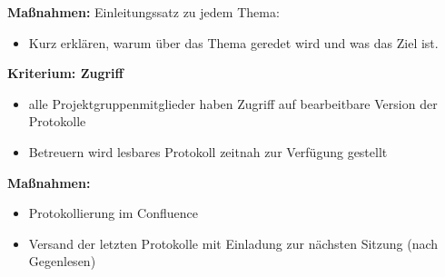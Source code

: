 \textbf{Maßnahmen: }
Einleitungssatz zu jedem Thema: 
\begin{itemize}
\item	Kurz erklären, warum über das Thema geredet wird und was das Ziel ist.
\end{itemize}

\textbf{Kriterium: Zugriff}
\begin{itemize}
\item	alle Projektgruppenmitglieder haben Zugriff auf bearbeitbare Version der Protokolle
\item	Betreuern wird lesbares Protokoll zeitnah zur Verfügung gestellt
\end{itemize}

\textbf{Maßnahmen: }
\begin{itemize}
\item	Protokollierung im Confluence
\item	Versand der letzten Protokolle mit Einladung zur nächsten Sitzung (nach Gegenlesen)
\end{itemize}


